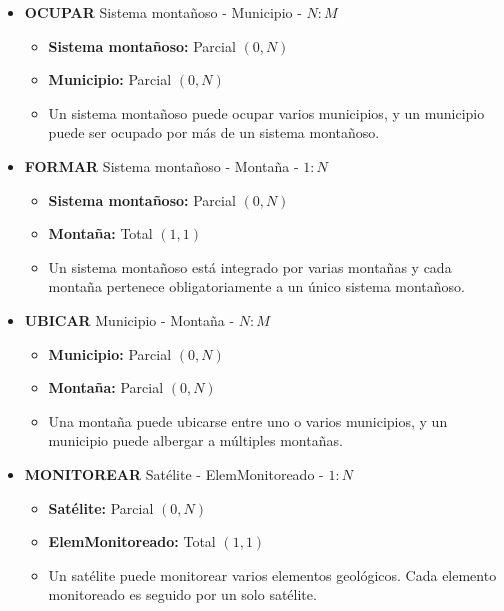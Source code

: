 \begin{itemize}
    \item \textbf{OCUPAR} Sistema montañoso - Municipio - $N:M$
    \begin{itemize}
        
        \item \textbf{Sistema montañoso:} Parcial $(0,N)$
        \item \textbf{Municipio:} Parcial $(0,N)$
        \item Un sistema montañoso puede ocupar varios municipios, y un municipio puede ser ocupado por más de un sistema montañoso.
    \end{itemize}

    \item \textbf{FORMAR} Sistema montañoso - Montaña - $1:N$
    \begin{itemize}
        
        \item \textbf{Sistema montañoso:} Parcial $(0,N)$
        \item \textbf{Montaña:} Total $(1,1)$
        \item Un sistema montañoso está integrado por varias montañas  y cada montaña pertenece obligatoriamente a un único sistema montañoso.
    \end{itemize}

    \item \textbf{UBICAR} Municipio - Montaña - $N:M$
    \begin{itemize}
        
        \item \textbf{Municipio:} Parcial $(0,N)$
        \item \textbf{Montaña:} Parcial $(0,N)$
        \item Una montaña puede ubicarse entre uno o varios municipios, y un municipio puede albergar a múltiples montañas.
    \end{itemize}

    \item \textbf{MONITOREAR} Satélite - ElemMonitoreado - $1:N$
    \begin{itemize}
        
        \item \textbf{Satélite:} Parcial $(0,N)$
        \item \textbf{ElemMonitoreado:} Total $(1,1)$
        \item Un satélite puede monitorear varios elementos geológicos. Cada elemento monitoreado es seguido por un solo satélite. 
    \end{itemize}
\end{itemize}
